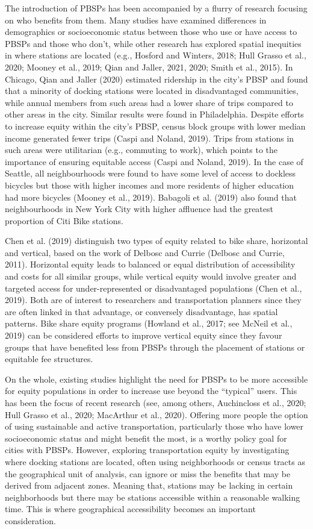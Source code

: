 \documentclass[]{elsarticle} %
\begin{document}
The introduction of PBSPs has been accompanied by a flurry of research
focusing on who benefits from them. Many studies have examined
differences in demographics or socioeconomic status between those who
use or have access to PBSPs and those who don't, while other research
has explored spatial inequities in where stations are located (e.g.,
Hosford and Winters, 2018; Hull Grasso et al., 2020; Mooney et al.,
2019; Qian and Jaller, 2021, 2020; Smith et al., 2015). In Chicago, Qian
and Jaller (2020) estimated ridership in the city's PBSP and found that
a minority of docking stations were located in disadvantaged
communities, while annual members from such areas had a lower share of
trips compared to other areas in the city. Similar results were found in
Philadelphia. Despite efforts to increase equity within the city's PBSP,
census block groups with lower median income generated fewer trips
(Caspi and Noland, 2019). Trips from stations in such areas were
utilitarian (e.g., commuting to work), which points to the importance of
ensuring equitable access (Caspi and Noland, 2019). In the case of
Seattle, all neighbourhoods were found to have some level of access to
dockless bicycles but those with higher incomes and more residents of
higher education had more bicycles (Mooney et al., 2019). Babagoli et
al. (2019) also found that neighbourhoods in New York City with higher
affluence had the greatest proportion of Citi Bike stations.

Chen et al. (2019) distinguish two types of equity related to bike
share, horizontal and vertical, based on the work of Delbosc and Currie
(Delbosc and Currie, 2011). Horizontal equity leads to balanced or equal
distribution of accessibility and costs for all similar groups, while
vertical equity would involve greater and targeted access for
under-represented or disadvantaged populations (Chen et al., 2019). Both
are of interest to researchers and transportation planners since they
are often linked in that advantage, or conversely disadvantage, has
spatial patterns. Bike share equity programs (Howland et al., 2017; see
McNeil et al., 2019) can be considered efforts to improve vertical
equity since they favour groups that have benefited less from PBSPs
through the placement of stations or equitable fee structures.

On the whole, existing studies highlight the need for PBSPs to be more
accessible for equity populations in order to increase use beyond the
``typical'' users. This has been the focus of recent research (see,
among others, Auchincloss et al., 2020; Hull Grasso et al., 2020;
MacArthur et al., 2020). Offering more people the option of using
sustainable and active transportation, particularly those who have lower
socioeconomic status and might benefit the most, is a worthy policy goal
for cities with PBSPs. However, exploring transportation equity by
investigating where docking stations are located, often using
neighborhoods or census tracts as the geographical unit of analysis, can
ignore or miss the benefits that may be derived from adjacent zones.
Meaning that, stations may be lacking in certain neighborhoods but there
may be stations accessible within a reasonable walking time. This is
where geographical accessibility becomes an important consideration.
\end{document}
